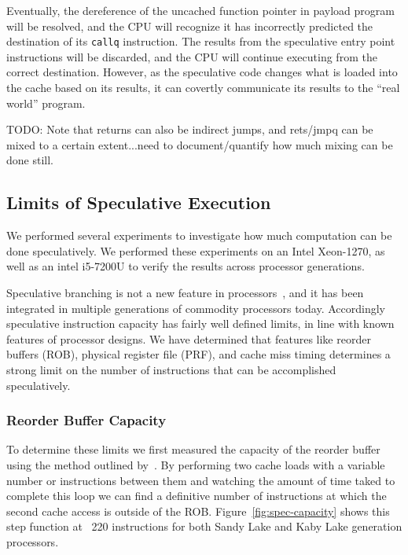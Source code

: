 Eventually, the dereference of the uncached function pointer in payload program
will be resolved, and the CPU will recognize it has incorrectly predicted the
destination of its \texttt{callq} instruction. The results from the speculative
entry point instructions will be discarded, and the CPU will continue executing
from the correct destination. However, as the speculative code changes what is
loaded into the cache based on its results, it can covertly communicate its
results to the ``real world'' program.


TODO: Note that returns can also be indirect jumps, and rets/jmpq can be mixed
to a certain extent...need to document/quantify how much mixing can be done
still.

\FigSpecMeasure

\subsection{Limits of Speculative Execution}
We performed several experiments to investigate how much computation can be done
speculatively. We performed these experiments on an Intel Xeon-1270, as well as 
an intel i5-7200U to verify the results across processor generations. 

Speculative branching is not a new feature in processors~\cite{branching-hist}, 
and it has been integrated in multiple generations of commodity processors today. 
Accordingly speculative instruction capacity has fairly well defined limits, in 
line with known features of processor designs. We have determined that features 
like reorder buffers (ROB), physical register file (PRF), and cache miss timing
determines a strong limit on the number of instructions that can be accomplished
speculatively. 

\subsubsection{Reorder Buffer Capacity} \label{sssec:ROB}
To determine these limits we first measured the capacity of the reorder buffer
using the method outlined by~\cite{intel-rob-capacity}. By performing two cache loads
with a variable number or instructions between them and watching the amount of 
time taked to complete this loop we can find a definitive number of instructions
at which the second cache access is outside of the ROB. Figure~\ref{fig:spec-capacity}
shows this step function at ~220 instructions for both Sandy Lake and Kaby Lake 
generation processors. 

